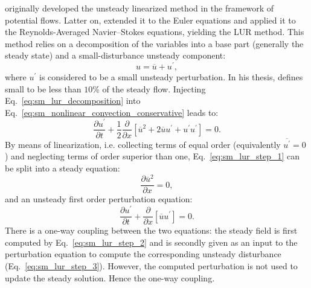 
\citet{Verdon1984} originally developed the unsteady linearized 
method in the framework of potential flows. Latter on, \citet{Hall1989}
extended it to the Euler equations and
\citet{Clark2000} applied it to the Reynolds-Averaged Navier--Stokes equations,
yielding the LUR method.
This method relies on a decomposition of the variables
into a base part (generally the steady state) 
and a small-disturbance unsteady component:
\begin{equation}
	u = \overline{u} + u^\prime,
	\label{eq:sm_lur_decomposition}
\end{equation}
where $u^\prime$ is considered to be a small unsteady perturbation.
In his thesis,
\citet{Hall1987} defines small to be less than $10\%$ of the
steady flow.
Injecting Eq.~\eqref{eq:sm_lur_decomposition} into 
Eq.~\eqref{eq:sm_nonlinear_convection_conservative} leads to:
\begin{equation}
	\frac{\partial u^\prime}{\partial t} + 
	\frac{1}{2}\frac{\partial}{\partial x} \left[
	\overline{u}^2 + 2 \overline{u} u^\prime + u^\prime u^\prime \right] = 
	0.
	\label{eq:sm_lur_step_1}
\end{equation}
By means of linearization, i.e. collecting terms
of equal order (equivalently $\overline{u^\prime} = 0$) 
and neglecting terms of order superior than one, 
Eq.~\eqref{eq:sm_lur_step_1} can be split
into a steady equation:
\begin{equation}
	\frac{\partial \overline{u}^2}{\partial x} = 0,
	\label{eq:sm_lur_step_2}
\end{equation}
and an unsteady first order perturbation equation:
\begin{equation}
	\frac{\partial u^\prime}{\partial t} +
	\frac{\partial}{\partial x} \left[
	\overline{u} u^\prime \right] = 
	0.
	\label{eq:sm_lur_step_3}
\end{equation}
There is a one-way coupling between the two equations:
the steady field
is first computed by Eq.~\eqref{eq:sm_lur_step_2}
and is secondly given as an input to the
perturbation equation to compute
the corresponding unsteady disturbance (Eq.~\eqref{eq:sm_lur_step_3}). 
However, the computed
perturbation is not used to update the steady solution.
Hence the one-way coupling.

